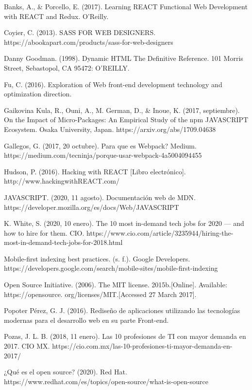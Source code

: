 \begin{thebibliography}{100} 

\bibitem{} Banks, A., & Porcello, E. (2017). Learning REACT Functional Web Development with REACT and Redux. O’Reilly.

\bibitem{} Coyier, C. (2013). SASS FOR WEB DESIGNERS. https://abookapart.com/products/sass-for-web-designers

\bibitem{} Danny Goodman. (1998). Dynamic HTML The Definitive Reference. 101 Morris Street, Sebastopol, CA 95472: O'REILLY.

\bibitem{} Fu, C. (2016). Exploration of Web front-end development technology and optimization direction.

\bibitem{} Gaikovina Kula, R., Ouni, A., M. German, D., & Inoue, K. (2017, septiembre). On the Impact of Micro-Packages: An Empirical Study of the npm JAVASCRIPT Ecosystem. Osaka University, Japan. https://arxiv.org/abs/1709.04638

\bibitem{} Gallegos, G. (2017, 20 octubre). Para que es Webpack? Medium. https://medium.com/tecninja/porque-usar-webpack-4a5004094455

\bibitem{} Hudson, P. (2016). Hacking with REACT [Libro electrónico]. http://www.hackingwithREACT.com/

\bibitem{} JAVASCRIPT. (2020, 11 agosto). Documentación web de MDN. https://developer.mozilla.org/es/docs/Web/JAVASCRIPT

\bibitem{} K. White, S. (2020, 10 enero). The 10 most in-demand tech jobs for 2020 — and how to hire for them. CIO. https://www.cio.com/article/3235944/hiring-the-most-in-demand-tech-jobs-for-2018.html

\bibitem{} Mobile-first indexing best practices. (s. f.). Google Developers. https://developers.google.com/search/mobile-sites/mobile-first-indexing


\bibitem{} Open Source Initiative. (2006). The MIT license. 2015b.[Online]. Available: https://opensource. org/licenses/MIT.[Accessed 27 March 2017].


\bibitem{} Popoter Pérez, G. J. (2016). Rediseño de aplicaciones utilizando las tecnologías modernas para el desarrollo web en su parte Front-end.


\bibitem{} Pozas, J. L. B. (2018, 11 enero). Las 10 profesiones de TI con mayor demanda en 2017. CIO MX. https://cio.com.mx/las-10-profesiones-ti-mayor-demanda-en-2017/

\bibitem{} ¿Qué es el open source? (2020). Red Hat. https://www.redhat.com/es/topics/open-source/what-is-open-source


\end{thebibliography}
